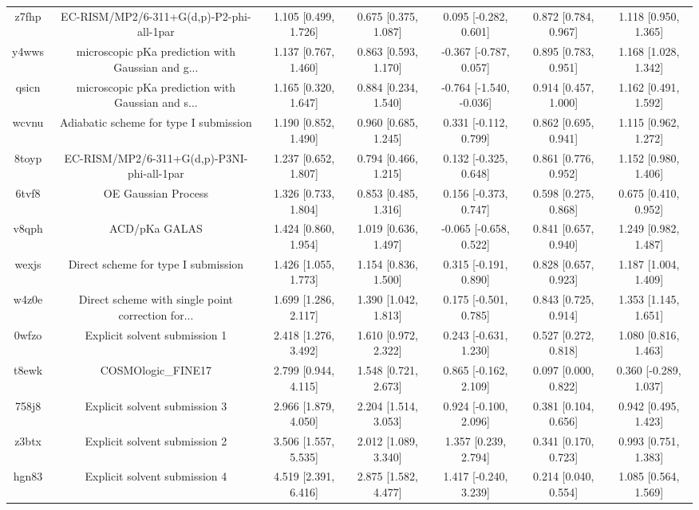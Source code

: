 \documentclass{article}
\begin{document}
\begin{center}
\begin{longtable}{|ccccccc|}
 z7fhp &           EC-RISM/MP2/6-311+G(d,p)-P2-phi-all-1par &  1.105 [0.499, 1.726] &  0.675 [0.375, 1.087] &    0.095 [-0.282, 0.601] &  0.872 [0.784, 0.967] &   1.118 [0.950, 1.365] \\
 y4wws &  microscopic pKa prediction with Gaussian and g... &  1.137 [0.767, 1.460] &  0.863 [0.593, 1.170] &   -0.367 [-0.787, 0.057] &  0.895 [0.783, 0.951] &   1.168 [1.028, 1.342] \\
 qsicn &  microscopic pKa prediction with Gaussian and s... &  1.165 [0.320, 1.647] &  0.884 [0.234, 1.540] &  -0.764 [-1.540, -0.036] &  0.914 [0.457, 1.000] &   1.162 [0.491, 1.592] \\
 wcvnu &             Adiabatic scheme for type I submission &  1.190 [0.852, 1.490] &  0.960 [0.685, 1.245] &    0.331 [-0.112, 0.799] &  0.862 [0.695, 0.941] &   1.115 [0.962, 1.272] \\
 8toyp &         EC-RISM/MP2/6-311+G(d,p)-P3NI-phi-all-1par &  1.237 [0.652, 1.807] &  0.794 [0.466, 1.215] &    0.132 [-0.325, 0.648] &  0.861 [0.776, 0.952] &   1.152 [0.980, 1.406] \\
 6tvf8 &                                OE Gaussian Process &  1.326 [0.733, 1.804] &  0.853 [0.485, 1.316] &    0.156 [-0.373, 0.747] &  0.598 [0.275, 0.868] &   0.675 [0.410, 0.952] \\
 v8qph &                                      ACD/pKa GALAS &  1.424 [0.860, 1.954] &  1.019 [0.636, 1.497] &   -0.065 [-0.658, 0.522] &  0.841 [0.657, 0.940] &   1.249 [0.982, 1.487] \\
 wexjs &                Direct scheme for type I submission &  1.426 [1.055, 1.773] &  1.154 [0.836, 1.500] &    0.315 [-0.191, 0.890] &  0.828 [0.657, 0.923] &   1.187 [1.004, 1.409] \\
 w4z0e &  Direct scheme with single point correction for... &  1.699 [1.286, 2.117] &  1.390 [1.042, 1.813] &    0.175 [-0.501, 0.785] &  0.843 [0.725, 0.914] &   1.353 [1.145, 1.651] \\
 0wfzo &                      Explicit solvent submission 1 &  2.418 [1.276, 3.492] &  1.610 [0.972, 2.322] &    0.243 [-0.631, 1.230] &  0.527 [0.272, 0.818] &   1.080 [0.816, 1.463] \\
 t8ewk &                                 COSMOlogic\_FINE17 &  2.799 [0.944, 4.115] &  1.548 [0.721, 2.673] &    0.865 [-0.162, 2.109] &  0.097 [0.000, 0.822] &  0.360 [-0.289, 1.037] \\
 758j8 &                      Explicit solvent submission 3 &  2.966 [1.879, 4.050] &  2.204 [1.514, 3.053] &    0.924 [-0.100, 2.096] &  0.381 [0.104, 0.656] &   0.942 [0.495, 1.423] \\
 z3btx &                      Explicit solvent submission 2 &  3.506 [1.557, 5.535] &  2.012 [1.089, 3.340] &     1.357 [0.239, 2.794] &  0.341 [0.170, 0.723] &   0.993 [0.751, 1.383] \\
 hgn83 &                      Explicit solvent submission 4 &  4.519 [2.391, 6.416] &  2.875 [1.582, 4.477] &    1.417 [-0.240, 3.239] &  0.214 [0.040, 0.554] &   1.085 [0.564, 1.569] \\
\end{longtable}
\end{center}
\end{document}
